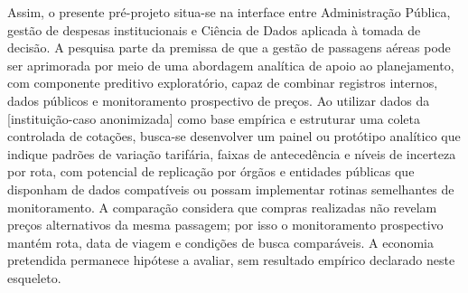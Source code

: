 \begin{resumo}
Assim, o presente pré-projeto situa-se na interface entre Administração Pública, gestão de despesas institucionais e Ciência de Dados aplicada à tomada de decisão. A pesquisa parte da premissa de que a gestão de passagens aéreas pode ser aprimorada por meio de uma abordagem analítica de apoio ao planejamento, com componente preditivo exploratório, capaz de combinar registros internos, dados públicos e monitoramento prospectivo de preços. Ao utilizar dados da [instituição-caso anonimizada] como base empírica e estruturar uma coleta controlada de cotações, busca-se desenvolver um painel ou protótipo analítico que indique padrões de variação tarifária, faixas de antecedência e níveis de incerteza por rota, com potencial de replicação por órgãos e entidades públicas que disponham de dados compatíveis ou possam implementar rotinas semelhantes de monitoramento.
A comparação considera que compras realizadas não revelam preços alternativos da mesma passagem; por isso o monitoramento prospectivo mantém rota, data de viagem e condições de busca comparáveis. A economia pretendida permanece hipótese a avaliar, sem resultado empírico declarado neste esqueleto.
\end{resumo}

